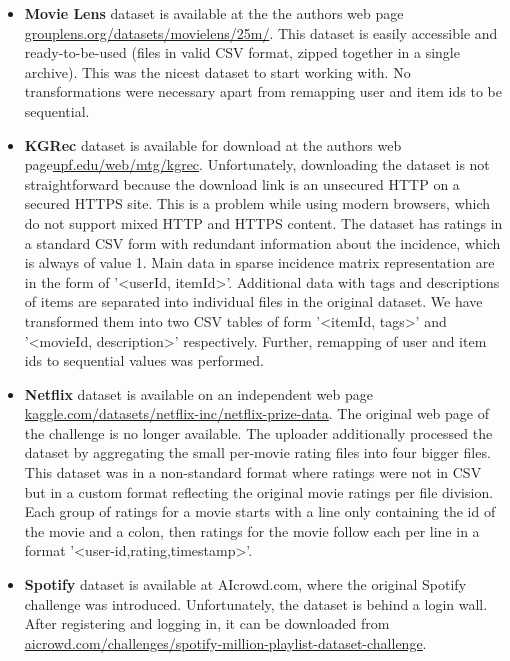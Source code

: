 \begin{itemize}
    \item \textbf{Movie Lens} dataset is available at the the authors web page \newline \href{https://grouplens.org/datasets/movielens/25m/}{grouplens.org/datasets/movielens/25m/}. This dataset is easily accessible and ready-to-be-used (files in valid CSV format, zipped together in a single archive). This was the nicest dataset to start working with. No transformations were necessary apart from remapping user and item ids to be sequential.
    
    \item \textbf{KGRec} dataset is available for download at the authors web page\newline \href{https://www.upf.edu/web/mtg/kgrec}{upf.edu/web/mtg/kgrec}. Unfortunately, downloading the dataset is not straightforward because the download link is an unsecured HTTP on a secured HTTPS site. This is a problem while using modern browsers, which do not support mixed HTTP and HTTPS content. The dataset has ratings in a standard CSV form with redundant information about the incidence, which is always of value 1. Main data in sparse incidence matrix representation are in the form of '\textless userId, itemId\textgreater'. Additional data with tags and descriptions of items are separated into individual files in the original dataset. We have transformed them into two CSV tables of form '\textless itemId, tags\textgreater' and '\textless movieId, description\textgreater' respectively. Further, remapping of user and item ids to sequential values was performed.
    \item \textbf{Netflix} dataset is available on an independent web page
    \newline
    \href{https://www.kaggle.com/datasets/netflix-inc/netflix-prize-data}{kaggle.com/datasets/netflix-inc/netflix-prize-data}.
    The original web page of the challenge is no longer available. The uploader additionally processed the dataset by aggregating the small per-movie rating files into four bigger files. This dataset was in a non-standard format where ratings were not in CSV but in a custom format reflecting the original movie ratings per file division. Each group of ratings for a movie starts with a line only containing the id of the movie and a colon, then ratings for the movie follow each per line in a format '\textless user-id,rating,timestamp\textgreater'.
    
    \item \textbf{Spotify} dataset is available at AIcrowd.com, where the original Spotify challenge was introduced. Unfortunately, the dataset is behind a login wall. After registering and logging in, it can be downloaded from \newline\href{https://www.aicrowd.com/challenges/spotify-million-playlist-dataset-challenge}{aicrowd.com/challenges/spotify-million-playlist-dataset-challenge}.
    

\end{itemize}
